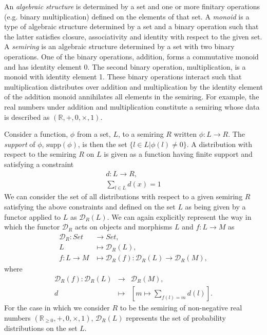 \documentclass[10pt]{article}
\begin{document}
An \emph{algebraic structure} is determined by a set and one or more finitary operations (e.g. binary multiplication) defined on the elements of that set. A \emph{monoid} is a type of algebraic structure determined by a set and a binary operation such that the latter satisfies closure, associativity and identity with respect to the given set. A \emph{semiring} is an algebraic structure determined by a set with two binary operations. One of the binary operations, addition, forms a commutative monoid and has identity element 0. The second binary operation, multiplication, is a monoid with identity element 1. These binary operations interact such that multiplication distributes over addition and multiplication by the identity element of the addition monoid annihilates all elements in the semiring. For example, the real numbers under addition and multiplication constitute a semiring whose data is described as $\left( \mathbb{R},+,0,\times,1 \right)$.

Consider a function, $\phi$ from a set, $L$, to a semiring $R$ written $\phi \colon L \rightarrow R$. The \emph{support} of $\phi$, $\text{supp}(\phi)$, is then the set $\{ l \in L | \phi(l) \neq 0 \}$. A distribution with respect to the semiring $R$ on $L$ is given as a function having finite support and satisfying a constraint
\begin{eqnarray*}
d \colon L \rightarrow R,\\
\sum_{l \in L} d(x) = 1
\end{eqnarray*}
We can consider the set of all distributions with respect to a given semiring $R$ satisfying the above constraints and defined on the set $L$ as being given by a functor applied to $L$ as $\mathcal{D}_R (L)$. We can again explicitly represent the way in which the functor $\mathcal{D}_R$ acts on objects and morphisms $L$ and $f \colon L \rightarrow M$ as
\begin{equation}\label{eq:distfunctor}
\begin{split}
\mathcal{D}_R \colon Set &\rightarrow Set,\\
L &\mapsto \mathcal{D}_R (L),\\
f \colon L \rightarrow M &\mapsto \mathcal{D}_R (f) \colon \mathcal{D}_R (L) \rightarrow \mathcal{D}_R (M),
\end{split}
\end{equation}
where
\begin{eqnarray*}
\mathcal{D}_R (f) \colon \mathcal{D}_R (L) &\rightarrow& \mathcal{D}_R (M),\\
d &\mapsto& \left[ m \mapsto \sum_{f(l)=m} d(l) \right].
\end{eqnarray*}
For the case in which we consider $R$ to be the semiring of non-negative real numbers $\left( \mathbb{R}_{\geq 0},+,0,\times,1 \right)$, $\mathcal{D}_R (L)$ represents the set of probability distributions on the set $L$.
\end{document}
